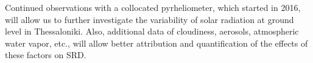 \documentclass[applsci,article,accept,moreauthors,pdftex]{Definitions/mdpi}
\begin{document}
Continued observations with a collocated pyrheliometer, which started in
2016, will allow us to further investigate the variability of solar
radiation at ground level in Thessaloniki. Also, additional data of
cloudiness, aerosols, atmospheric water vapor, etc., will allow better
attribution and quantification of the effects of these factors on SRD.


\vspace{6pt}




\end{document}
